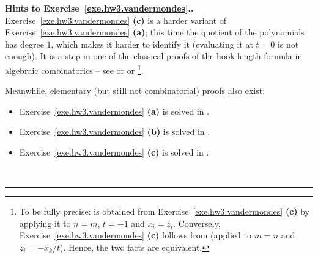 \documentclass[numbers=enddot,12pt,final,onecolumn,notitlepage]{scrartcl}%
\theoremstyle{definition}
\newenvironment{proof}[1][Proof]{\noindent\textbf{#1.} }{\ \rule{0.5em}{0.5em}}
\begin{document}
\begin{proof}[Hints to Exercise~\ref{exe.hw3.vandermondes}.]
Exercise~\ref{exe.hw3.vandermondes} \textbf{(c)} is a harder variant
of Exercise~\ref{exe.hw3.vandermondes} \textbf{(a)}; this time the
quotient of the polynomials has degree $1$, which makes it harder to
identify it (evaluating it at $t=0$ is not enough).
It is a step in one of the classical proofs of the hook-length formula
in algebraic combinatorics -- see \cite[\S 4.3, Exercise
10]{Fulton-Young} or \cite[Lemma 4.13]{Uecker16}
or \cite[Lemma 2]{GlaNg04}\footnote{To be fully
  precise: \cite[Lemma 2]{GlaNg04} is obtained from
  Exercise~\ref{exe.hw3.vandermondes} \textbf{(c)} by applying it to
  $n = m$, $t = -1$ and $x_i = z_i$. Conversely,
  Exercise~\ref{exe.hw3.vandermondes} \textbf{(c)} follows from
  \cite[Lemma 2]{GlaNg04} (applied to $m = n$ and $z_i = -x_k / t$).
  Hence, the two facts are equivalent.}.

Meanwhile, elementary (but still not combinatorial) proofs also exist:
\begin{itemize}
\item Exercise~\ref{exe.hw3.vandermondes} \textbf{(a)} is solved in
      \cite[Proposition 7.65]{detnotes}.
\item Exercise~\ref{exe.hw3.vandermondes} \textbf{(b)} is solved in
      \cite[Proposition 7.67]{detnotes}.
\item Exercise~\ref{exe.hw3.vandermondes} \textbf{(c)} is solved in
      \cite[Exercise 55]{detnotes}.
\end{itemize}
\end{proof}
\end{document}
